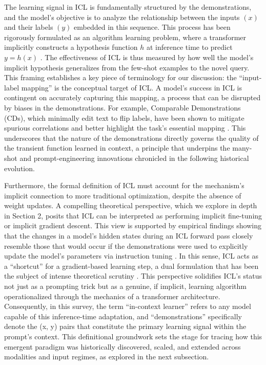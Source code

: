 \documentclass[11pt]{article}
\begin{document}
The learning signal in ICL is fundamentally structured by the demonstrations, and the model's objective is to analyze the relationship between the inputs \((x)\) and their labels \((y)\) embedded in this sequence. This process has been rigorously formulated as an algorithm learning problem, where a transformer implicitly constructs a hypothesis function \(h\) at inference time to predict \(y = h(x)\) \cite{ref2}. The effectiveness of ICL is thus measured by how well the model's implicit hypothesis generalizes from the few-shot examples to the novel query. This framing establishes a key piece of terminology for our discussion: the ``input-label mapping'' is the conceptual target of ICL. A model's success in ICL is contingent on accurately capturing this mapping, a process that can be disrupted by biases in the demonstrations. For example, Comparable Demonstrations (CDs), which minimally edit text to flip labels, have been shown to mitigate spurious correlations and better highlight the task's essential mapping \cite{ref8}. This underscores that the nature of the demonstrations directly governs the quality of the transient function learned in context, a principle that underpins the many-shot and prompt-engineering innovations chronicled in the following historical evolution.

Furthermore, the formal definition of ICL must account for the mechanism's implicit connection to more traditional optimization, despite the absence of weight updates. A compelling theoretical perspective, which we explore in depth in Section 2, posits that ICL can be interpreted as performing implicit fine-tuning or implicit gradient descent. This view is supported by empirical findings showing that the changes in a model's hidden states during an ICL forward pass closely resemble those that would occur if the demonstrations were used to explicitly update the model's parameters via instruction tuning \cite{ref9}. In this sense, ICL acts as a ``shortcut'' for a gradient-based learning step, a dual formulation that has been the subject of intense theoretical scrutiny \cite{ref10}. This perspective solidifies ICL's status not just as a prompting trick but as a genuine, if implicit, learning algorithm operationalized through the mechanics of a transformer architecture. Consequently, in this survey, the term ``in-context learner'' refers to any model capable of this inference-time adaptation, and ``demonstrations'' specifically denote the (x, y) pairs that constitute the primary learning signal within the prompt's context. This definitional groundwork sets the stage for tracing how this emergent paradigm was historically discovered, scaled, and extended across modalities and input regimes, as explored in the next subsection.
\end{document}
